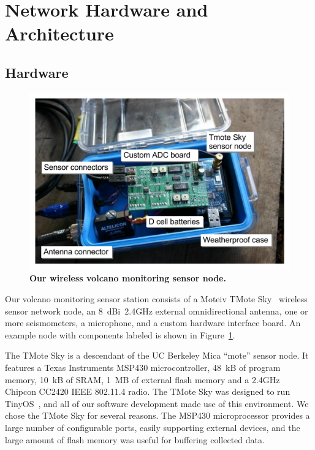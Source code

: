 \section{Network Hardware and Architecture}
\label{evaluation-sec-architecture}

\subsection{Hardware}

\begin{figure}[t]
\begin{center}
\includegraphics[width=1.0\hsize]{./3-evaluation/figs/node.pdf}
\end{center}
\caption{\textbf{Our wireless volcano monitoring sensor node.}}
\label{evaluation-fig-node}
\end{figure}

Our volcano monitoring sensor station consists of a Moteiv TMote
Sky~\cite{moteiv} wireless sensor network node, an 8~dBi~2.4GHz external
omnidirectional antenna, one or more seismometers, a microphone, and a custom
hardware interface board. An example node with components labeled is shown in
Figure~\ref{evaluation-fig-node}.

The TMote Sky is a descendant of the UC Berkeley Mica ``mote'' sensor node.
It features a Texas Instruments MSP430 microcontroller, 48~kB of program
memory, 10~kB of SRAM, 1~MB of external flash memory and a 2.4GHz Chipcon
CC2420 IEEE 802.11.4 radio. The TMote Sky was designed to run
TinyOS~\cite{tinyos-asplos00}, and all of our software development made use
of this environment. We chose the TMote Sky for several reasons. The MSP430
microprocessor provides a large number of configurable ports, easily
supporting external devices, and the large amount of flash memory was useful
for buffering collected data.

